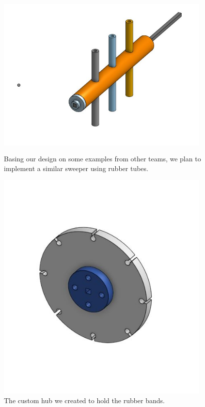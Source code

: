 \begin{figure}[ht]
\centering
\begin{minipage}[b]{.48\textwidth}
  \centering
  \includegraphics[width=0.95\textwidth]{Meetings/August/08-20-21/8-18-21_CAD_Image7 - Nathan Forrer.jpg}
  \caption{Basing our design on some examples from other teams, we plan to implement a similar sweeper using rubber tubes.}
  \label{fig:pic7}
\end{minipage}%
\hfill%
\begin{minipage}[b]{.48\textwidth}
  \centering
  \includegraphics[width=0.95\textwidth]{Meetings/August/08-20-21/8-18-21_CAD_Image8 - Nathan Forrer.jpg}
  \caption{The custom hub we created to hold the rubber bands.}
  \label{fig:pic8}
\end{minipage}
\end{figure}

